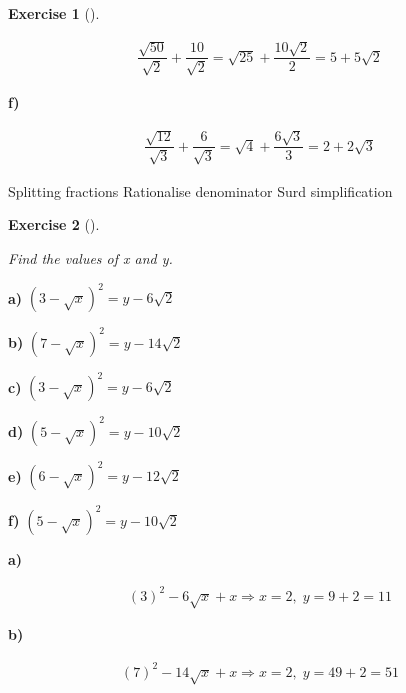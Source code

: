 \documentclass[
  letterpaper,
  DIV=11,
  numbers=noendperiod]{scrreprt}
\theoremstyle{definition}
\newtheorem{exercise}{Exercise}[chapter]
\theoremstyle{remark}
\begin{document}
\begin{exercise}[]
\begin{tcolorbox}
\[
\begin{aligned}
\dfrac{\sqrt{50}}{\sqrt{2}}+\dfrac{10}{\sqrt{2}}=\sqrt{25}+\dfrac{10\sqrt{2}}{2}=5+5\sqrt{2}
\end{aligned}
\]

\textbf{f)}

\[
\begin{aligned}
\dfrac{\sqrt{12}}{\sqrt{3}}+\dfrac{6}{\sqrt{3}}=\sqrt{4}+\dfrac{6\sqrt{3}}{3}=2+2\sqrt{3}
\end{aligned}
\]

\end{tcolorbox}

{Splitting fractions} {Rationalise denominator} {Surd simplification}

\end{exercise}

\begin{exercise}[]\protect\hypertarget{exr-u2-57}{}\label{exr-u2-57}

\emph{Find the values of x and y.}

\textbf{a)} \(\displaystyle (3-\sqrt{x})^2 = y - 6\sqrt{2}\)

\textbf{b)} \(\displaystyle (7-\sqrt{x})^2 = y - 14\sqrt{2}\)

\textbf{c)} \(\displaystyle (3-\sqrt{x})^2 = y - 6\sqrt{2}\)

\textbf{d)} \(\displaystyle (5-\sqrt{x})^2 = y - 10\sqrt{2}\)

\textbf{e)} \(\displaystyle (6-\sqrt{x})^2 = y - 12\sqrt{2}\)

\textbf{f)} \(\displaystyle (5-\sqrt{x})^2 = y - 10\sqrt{2}\)

\begin{tcolorbox}[enhanced jigsaw, opacitybacktitle=0.6, coltitle=black, arc=.35mm, colframe=quarto-callout-tip-color-frame, colback=white, bottomrule=.15mm, left=2mm, colbacktitle=quarto-callout-tip-color!10!white, titlerule=0mm, opacityback=0, title=\textcolor{quarto-callout-tip-color}{\faLightbulb}\hspace{0.5em}{🔍 View Solutions}, leftrule=.75mm, breakable, rightrule=.15mm, bottomtitle=1mm, toptitle=1mm, toprule=.15mm]

\textbf{a)}

\[
\begin{aligned}
(3)^2-6\sqrt{x}+x \Rightarrow x=2,\; y=9+2=11
\end{aligned}
\]

\textbf{b)}

\[
\begin{aligned}
(7)^2-14\sqrt{x}+x \Rightarrow x=2,\; y=49+2=51
\end{aligned}
\]


\end{tcolorbox}
\end{exercise}
\end{document}

